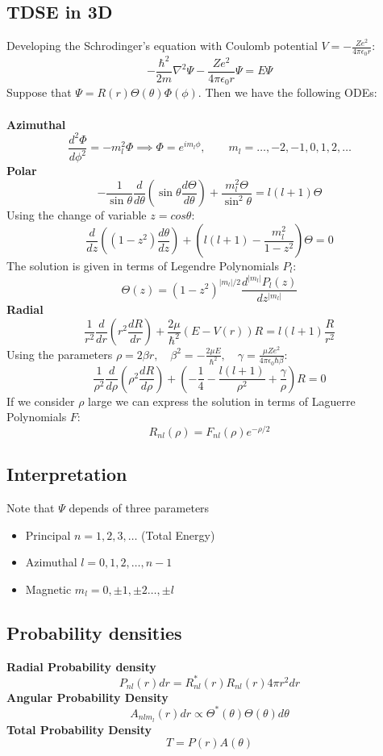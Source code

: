\documentclass{myclass}
\newcommand{\N}{\nabla}
\begin{document}
\subsection{TDSE in 3D}
Developing the Schrodinger's equation with Coulomb potential $V = - \frac{Ze^2}{4\pi \epsilon_0r}$:
$$
-\frac{\hbar^2}{2m}\N^2\Psi - \frac{Ze^2}{4\pi \epsilon_0r}\Psi = E\Psi
$$
Suppose that $\Psi = R(r)\Theta(\theta)\Phi(\phi)$. Then we have the following ODEs:\\
\\
\textbf{Azimuthal}\\
$$
\frac{d^2\Phi}{d\phi^2} = -m_l^2\Phi \implies \boxed{\Phi= e^{im_l\phi}}, \qquad m_l = \ldots, -2, -1, 0, 1, 2, \ldots
$$
\textbf{Polar}\\
$$
-\frac{1}{\sin\theta} \frac{d}{d\theta}\left(\sin\theta\frac{d\Theta}{d\theta}\right) + \frac{m_l^2\Theta}{\sin^2\theta} = l(l+1)\Theta
$$
Using the change of variable $z = cos\theta$:
$$
\frac{d}{dz}\left((1-z^2)\frac{d\theta}{dz}\right) + \left( l(l+1) - \frac{m_l^2}{1-z^2} \right)\Theta = 0
$$
The solution is given in terms of Legendre Polynomials $P_l$:
$$
\boxed{\Theta(z) = (1-z^2)^{|m_l|/2}\frac{d^{|m_l|}P_l(z)}{dz^{|m_l|}}}
$$
\textbf{Radial}\\
$$
\frac{1}{r^2} \frac{d}{dr}\left(r^2\frac{dR}{dr}\right) + \frac{2\mu}{\hbar^2}(E-V(r))R = l(l+1)\frac{R}{r^2}
$$
Using the parameters $ \rho = 2\beta r, \quad \beta^2 = -\frac{2\mu E}{\hbar^2}, \quad
\gamma = \frac{\mu Z e^2}{4\pi \epsilon_0 \hbar \beta}$:
$$
\frac{1}{\rho^2}\frac{d}{d\rho}\left( \rho^2\frac{dR}{d\rho} \right) + \left( -\frac{1}{4} - \frac{l(l+1)}{\rho^2} + \frac{\gamma}{\rho} \right)R = 0
$$
If we consider $\rho$ large we can express the solution in terms of Laguerre Polynomials $F$:
$$
\boxed{R_{nl}(\rho) = F_{nl}(\rho)e^{-\rho/2}}
$$


\subsection{Interpretation}
Note that $\Psi$ depends of three parameters 
\begin{itemize}
    \item Principal $n = 1, 2, 3, \ldots$ (Total Energy)
    \item Azimuthal $l= 0, 1, 2, \ldots, n-1$
    \item Magnetic $m_l = 0, \pm 1,\pm 2 \ldots, \pm l$
\end{itemize}

\subsection{Probability densities}
\textbf{Radial Probability density} \\
$$
\boxed{P_{nl}(r)dr = R_{nl}^*(r)R_{nl}(r)4\pi r^2dr} 
$$
\textbf{Angular Probability Density} \\
$$
\boxed{A_{nlm_l}(r)dr \propto \Theta^*(\theta)\Theta(\theta)d\theta} 
$$
\textbf{Total Probability Density} \\
$$
\boxed{T = P(r)A(\theta)} 
$$
\end{document}

